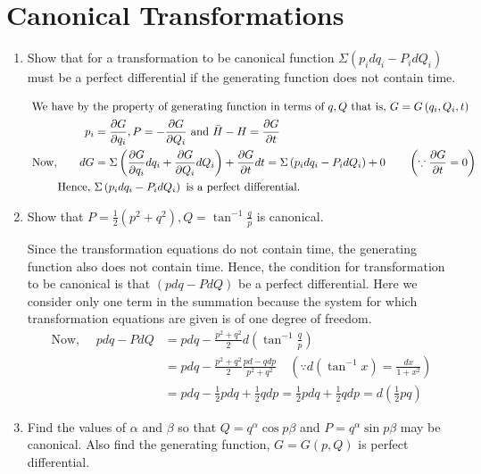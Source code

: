 \section{Canonical Transformations}
\begin{enumerate}
	\item Show that for a transformation to be canonical function 
	$\Sigma\left(p_{i} d q_{i}-P_{i} d Q_{i}\right)$ must be a perfect differential if the generating function does not contain time. 
	\begin{answer}
		\begin{align*}
	\intertext{	We have by the property of generating function in terms of $q, Q$ that is, $G=G\left(q_{i}, Q_{i}, t\right)$}
	p_{i}&=\frac{\partial G}{\partial q_{i}}, P=-\frac{\partial G}{\partial Q_{i}}\text{ and }\bar{H}-H=\frac{\partial G}{\partial t}\\
\text{	Now,}\qquad
	d G&=\Sigma\left(\frac{\partial G}{\partial q_{i}} d q_{i}+\frac{\partial G}{\partial Q_{i}} d Q_{i}\right)+\frac{\partial G}{\partial t} d t=\Sigma\left(p_{i} d q_{i}-P_{i} d Q_{i}\right)+0 \qquad\left(\because \frac{\partial G}{\partial t}=0\right)\\
	\text{Hence, }&\Sigma\left(p_{i} d q_{i}-P_{i} d Q_{i}\right)\text{ is a perfect differential.}
		\end{align*}
	\end{answer}
	\item Show that $P=\frac{1}{2}\left(p^{2}+q^{2}\right), Q=\tan ^{-1} \frac{q}{p}$ is canonical.
	\begin{answer}
		 Since the transformation equations do not contain time, the generating function also does not contain time. Hence, the condition for transformation to be canonical is that $(p d q-P d Q)$ be a perfect differential. Here we consider only one term in the summation because the system for which transformation equations are given is of one degree of freedom.
		\begin{align*}
		\text{Now, }\quad p d q-P d Q&=p d q-\frac{p^{2}+q^{2}}{2} d\left(\tan ^{-1} \frac{q}{p}\right)\\
		&=p d q-\frac{p^{2}+q^{2}}{2} \frac{p d-q d p}{p^{2}+q^{2}} \quad\left(\because d\left(\tan ^{-1} x\right)=\frac{d x}{1+x^{2}}\right)\\
		&=p d q-\frac{1}{2} p d q+\frac{1}{2} q d p=\frac{1}{2} p d q+\frac{1}{2} q d p=d\left(\frac{1}{2} p q\right)
		\end{align*}
	\end{answer}
	\item Find the values of $\alpha$ and $\beta$ so that $Q=q^{\alpha} \cos p \beta$ and $P=q^{\alpha} \sin p \beta$ may be canonical. Also find the generating function, $G=G(p, Q)$ is perfect differential.

\end{enumerate}
